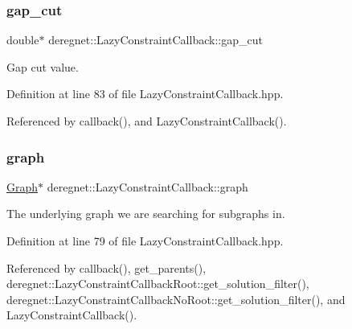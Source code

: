 \subsubsection{\texorpdfstring{gap\+\_\+cut}{gap\_cut}}
{\footnotesize\ttfamily double$\ast$ deregnet\+::\+Lazy\+Constraint\+Callback\+::gap\+\_\+cut\hspace{0.3cm}{\ttfamily [protected]}}



Gap cut value. 



Definition at line 83 of file Lazy\+Constraint\+Callback.\+hpp.



Referenced by callback(), and Lazy\+Constraint\+Callback().

\mbox{\label{classderegnet_1_1LazyConstraintCallback_af481c9d68dea2dab035e1f2f79cda4d5}} 
\subsubsection{\texorpdfstring{graph}{graph}}
{\footnotesize\ttfamily \hyperlink{namespacederegnet_a55b76c55bbabc682cbc61f8b9948799e}{Graph}$\ast$ deregnet\+::\+Lazy\+Constraint\+Callback\+::graph\hspace{0.3cm}{\ttfamily [protected]}}



The underlying graph we are searching for subgraphs in. 



Definition at line 79 of file Lazy\+Constraint\+Callback.\+hpp.



Referenced by callback(), get\+\_\+parents(), deregnet\+::\+Lazy\+Constraint\+Callback\+Root\+::get\+\_\+solution\+\_\+filter(), deregnet\+::\+Lazy\+Constraint\+Callback\+No\+Root\+::get\+\_\+solution\+\_\+filter(), and Lazy\+Constraint\+Callback().

\mbox{\label{classderegnet_1_1LazyConstraintCallback_a0ced82ab9f112cbb3e1df10a84be6c64}} 
